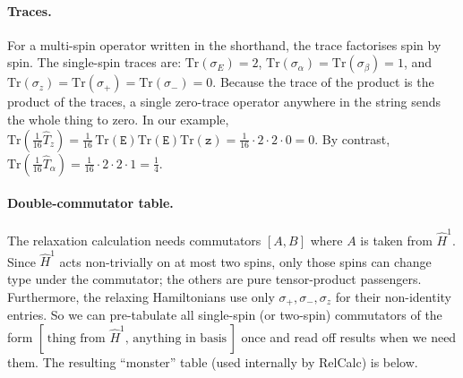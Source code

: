 \documentclass[notitlepage,11pt]{article}
\begin{document}
\paragraph{Traces.} For a multi-spin operator written in the shorthand, the trace factorises spin by spin. The single-spin traces are: $\mathrm{Tr}(\sigma_E)=2$, $\mathrm{Tr}(\sigma_\alpha)=\mathrm{Tr}(\sigma_\beta)=1$, and $\mathrm{Tr}(\sigma_z)=\mathrm{Tr}(\sigma_+)=\mathrm{Tr}(\sigma_-)=0$. Because the trace of the product is the product of the traces, a single zero-trace operator anywhere in the string sends the whole thing to zero. In our example, $\mathrm{Tr}(\tfrac{1}{16}\hat{T}_z)=\tfrac{1}{16}\,\mathrm{Tr}(\texttt{E})\mathrm{Tr}(\texttt{E})\mathrm{Tr}(\texttt{z})=\tfrac{1}{16}\cdot 2\cdot 2\cdot 0=0$. By contrast, $\mathrm{Tr}(\frac{1}{16}\hat{T}_\alpha)=\tfrac{1}{16}\cdot 2\cdot 2\cdot 1=\tfrac{1}{4}$.

\paragraph{Double-commutator table.} The relaxation calculation needs commutators $[A,B]$ where $A$ is taken from $\hat{H}^1$. Since $\hat{H}^1$ acts non-trivially on at most two spins, only those spins can change type under the commutator; the others are pure tensor-product passengers. Furthermore, the relaxing Hamiltonians use only $\sigma_+,\sigma_-,\sigma_z$ for their non-identity entries. So we can pre-tabulate all single-spin (or two-spin) commutators of the form $[\,\text{thing from }\hat{H}^1,\,\text{anything in basis}\,]$ once and read off results when we need them. The resulting ``monster'' table (used internally by RelCalc) is below.
\end{document}
